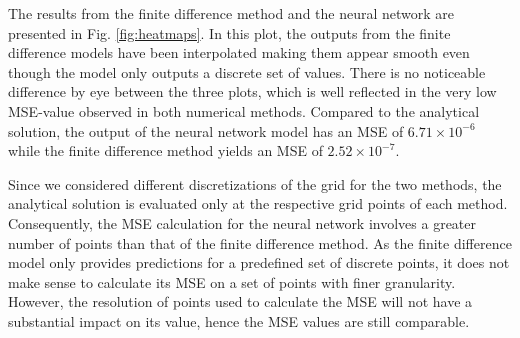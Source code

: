 The results from the finite difference method and the neural network are presented in Fig. \ref{fig:heatmaps}.
In this plot, the outputs from the finite difference models have been interpolated making them appear smooth even though the model only outputs a discrete set of values. 
There is no noticeable difference by eye between the three plots, which is well reflected in the very low MSE-value observed in both numerical methods. 
Compared to the analytical solution, the output of the neural network model has an MSE of $ 6.71 \times 10^{-6}$ while the finite difference method yields an MSE of $2.52 \times 10^{-7}$. 

Since we considered different discretizations of the grid for the two methods, the analytical solution is evaluated only at the respective grid points of each method. 
Consequently, the MSE calculation for the neural network involves a greater number of points than that of the finite difference method.
As the finite difference model only provides predictions for a predefined set of discrete points, it does not make sense to calculate its MSE on a set of points with finer granularity.
However, the resolution of points used to calculate the MSE will not have a substantial impact on its value, hence the MSE values are still comparable.

